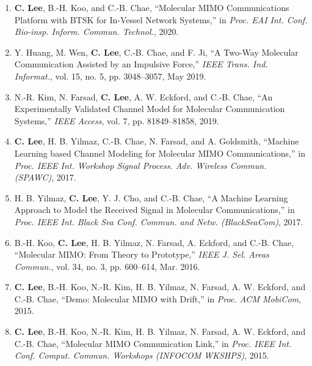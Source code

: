 \documentclass[a4paper,9pt]{extarticle}
\begin{document}
\begin{enumerate}
    \item \textbf{C. Lee}, B.-H. Koo, and C.-B. Chae, ``Molecular MIMO Communications Platform with BTSK for In-Vessel Network Systems,'' in \textit{Proc. EAI Int. Conf. Bio-insp. Inform. Commun. Technol.}, 2020.
    \item Y. Huang, M. Wen, \textbf{C. Lee}, C.-B. Chae, and F. Ji, ``A Two-Way Molecular Communication Assisted by an Impulsive Force,'' \textit{IEEE Trans. Ind. Informat.}, vol. 15, no. 5, pp. 3048--3057, May 2019.
	\item N.-R. Kim, N. Farsad, \textbf{C. Lee}, A. W. Eckford, and C.-B. Chae, ``An Experimentally Validated Channel Model for Molecular Communication Systems,'' \textit{IEEE Access}, vol. 7, pp. 81849--81858, 2019.
    \item \textbf{C. Lee}, H. B. Yilmaz, C.-B. Chae, N. Farsad, and A. Goldsmith, ``Machine Learning based Channel Modeling for Molecular MIMO Communications,'' in \textit{Proc. IEEE Int. Workshop Signal Process. Adv. Wireless Commun. (SPAWC)}, 2017.
    \item H. B. Yilmaz, \textbf{C. Lee}, Y. J. Cho, and C.-B. Chae, ``A Machine Learning Approach to Model the Received Signal in Molecular Communications,'' in \textit{Proc. IEEE Int. Black Sea Conf. Commun. and Netw. (BlackSeaCom)}, 2017.
    \item B.-H. Koo, \textbf{C. Lee}, H. B. Yilmaz, N. Farsad, A. Eckford, and C.-B. Chae, ``Molecular MIMO: From Theory to Prototype,'' \textit{IEEE J. Sel. Areas Commun.}, vol. 34, no. 3, pp. 600--614, Mar. 2016.
    \item \textbf{C. Lee}, B.-H. Koo, N.-R. Kim, H. B. Yilmaz, N. Farsad, A. W. Eckford, and C.-B. Chae, ``Demo: Molecular MIMO with Drift,'' in \textit{Proc. ACM MobiCom}, 2015.
    \item \textbf{C. Lee}, B.-H. Koo, N.-R. Kim, H. B. Yilmaz, N. Farsad, A. W. Eckford, and C.-B. Chae, ``Molecular MIMO Communication Link,'' in \textit{Proc. IEEE Int. Conf. Comput. Commun. Workshops (INFOCOM WKSHPS)}, 2015.
\end{enumerate}


\end{document}
